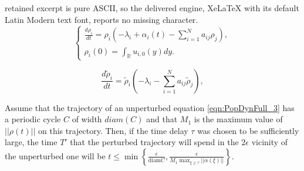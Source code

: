 \documentclass[10pt,a4paper]{amsart}
\begin{document}
retained excerpt is pure ASCII, so the delivered engine, XeLaTeX with its default Latin Modern text font, reports no missing character.
\begin{equation}\label{eqn:PopDynFull}
    \begin{cases}
        \frac{d\rho_i}{dt}=\rho_i\left(-\lambda_i+\alpha_i(t)-\sum_{i=1}^{N}a_{ij}\rho_j\right),\\
        \rho_i(0)=\int_{\mathbb{R}}u_{i,0}(y)dy.
    \end{cases}
\end{equation}

\begin{equation}\label{eqn:PopDynFull_3}
        \frac{d\widetilde{\rho}_i}{dt}=\widetilde{\rho}_i\left(-\lambda_i-\sum_{i=1}^{N}a_{ij}\widetilde{\rho}_j\right),
   \end{equation}

\begin{lemma}
\label{lem: dynamics LV}
    Assume that the trajectory of an unperturbed equation \eqref{eqn:PopDynFull_3} has a periodic cycle $C$ of width $diam (C)$  and that $M_1$ is the maximum value of $||\rho(t)||$ on this trajectory. Then, if the time delay $\tau$  was chosen to be sufficiently large, the time $T'$ that the perturbed trajectory will spend in the $2\epsilon$ vicinity of the unperturbed one will be $t\le \min\left\{\frac{\epsilon}{\mathrm{diam} C}, \frac{\epsilon}{M_1\max_{\xi\ge\tau}||\alpha(\xi)||}\right\}$.
\end{lemma}
\end{document}
